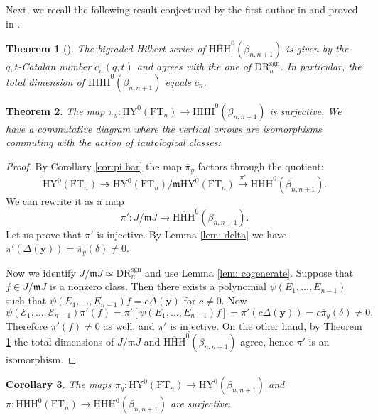 \documentclass{amsart}
\newcommand{\yy}{\mathbf{y}}
\newcommand{\mm}{\mathfrak{m}}
\newcommand{\DR}{\mathrm{DR}}
\newcommand{\FT}{\mathrm{FT}}
\newcommand{\HY}{\mathrm{HY}}
\newcommand{\sgn}{\mathrm{sgn}}
\newcommand{\CE}{\mathcal{E}}
\newcommand{\HHH}{\mathrm{HHH}}
\numberwithin{equation}{section}
\newtheorem{theorem}{Theorem}[section]
\newtheorem{corollary}[theorem]{Corollary}
\theoremstyle{definition}
\begin{document}
Next, we recall the following result conjectured by the first author in \cite{G} and proved in \cite{H}. 

\begin{theorem}[\cite{H}]
\label{thm: dimension}
The bigraded Hilbert series of $\overline{\HHH}^0(\beta_{n,n+1})$ is given by the $q,t$-Catalan number $c_n(q,t)$ and agrees with the one of $\DR_n^{\sgn}$. In particular, the total dimension of $\overline{\HHH}^0(\beta_{n,n+1})$ equals $c_n$.
\end{theorem}


\begin{theorem}
\label{thm: final}
The map $\overline{\pi}_y: \HY^0(\FT_n)\to \overline{\HHH}^0(\beta_{n,n+1})$ is surjective. We have a commutative diagram where the vertical arrows are isomorphisms commuting with the action of tautological classes:
\begin{center}
\end{center}
\end{theorem}

\begin{proof}
By Corollary \ref{cor:pi bar} the map $\overline{\pi}_y$ factors through the quotient:
$$
\HY^0(\FT_n)\twoheadrightarrow \HY^0(\FT_n)/\mm \HY^0(\FT_n) \xrightarrow{\pi'} \overline{\HHH}^0(\beta_{n,n+1}).
$$
We can rewrite it as a map
$$
\pi':J/\mm J\to  \overline{\HHH}^0(\beta_{n,n+1}).
$$
Let us prove that $\pi'$ is injective. By Lemma \ref{lem: delta} we have $\pi'(\Delta(\yy))=\overline{\pi}_y(\delta)\neq 0$.

Now we identify $J/\mm J\simeq \DR_n^{\sgn}$ and use Lemma \ref{lem: cogenerate}. Suppose that $f\in J/\mm J$ is a nonzero class. Then there exists a polynomial $\psi(E_1,\ldots,E_{n-1})$ such that  $\psi(E_1,\ldots,E_{n-1})f=c\Delta(\yy)$ for $c\neq 0$. Now 
$$
\psi(\CE_1,\ldots,\CE_{n-1})\pi'(f)=\pi'\left[\psi(E_1,\ldots,E_{n-1})f\right]=\pi'(c\Delta(\yy))=c\overline{\pi}_y(\delta)\neq 0.
$$
Therefore $\pi'(f)\neq 0$ as well, and $\pi'$ is injective. On the other hand, by Theorem \ref{thm: dimension} the total dimensions of $J/\mm J$ and $\overline{\HHH}^0(\beta_{n,n+1})$ agree, hence $\pi'$ is an isomorphism.
\end{proof}

\begin{corollary}
The maps $\pi_y:\HY^0(\FT_n)\to \HY^0(\beta_{n,n+1})$ and $\pi:\HHH^0(\FT_n)\to \HHH^0(\beta_{n,n+1})$ are surjective.
\end{corollary}
\end{document}
